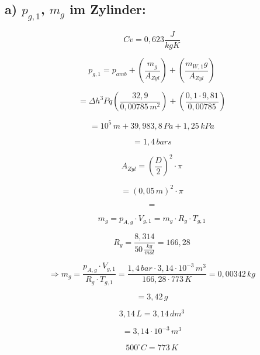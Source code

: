 \subsection*{a) $p_{g,1}$, $m_g$ im Zylinder:}

\[
Cv = 0{,}623 \frac{J}{kgK}
\]

\[
p_{g,1} = p_{amb} + \left( \frac{m_g}{A_{Zyl}} \right) + \left( \frac{m_{W,1}g}{A_{Zyl}} \right)
\]

\[
= \Delta h^3 Pq \left( \frac{32{,}9}{0{,}00785 \, m^2} \right) + \left( \frac{0{,}1 \cdot 9{,}81}{0{,}00785} \right)
\]

\[
= 10^5 \, m + 39{,}983{,}8 \, Pa + 1{,}25 \, kPa
\]

\[
= 1{,}4 \, bars
\]

\[
A_{Zyl} = \left( \frac{D}{2} \right)^2 \cdot \pi
\]

\[
= (0{,}05 \, m)^2 \cdot \pi
\]

\[
=
\]

\[
m_g = p_{A,g} \cdot V_{g,1} = m_g \cdot R_g \cdot T_{g,1}
\]

\[
R_g = \frac{8{,}314}{50 \, \frac{kg}{mol}} = 166{,}28
\]

\[
\Rightarrow m_g = \frac{p_{A,g} \cdot V_{g,1}}{R_g \cdot T_{g,1}} = \frac{1{,}4 \, bar \cdot 3{,}14 \cdot 10^{-3} \, m^3}{166{,}28 \cdot 773 \, K} = 0{,}00342 \, kg
\]

\[
= 3{,}42 \, g
\]

\[
3{,}14 \, L = 3{,}14 \, dm^3
\]

\[
= 3{,}14 \cdot 10^{-3} \, m^3
\]

\[
500^\circ C = 773 \, K
\]